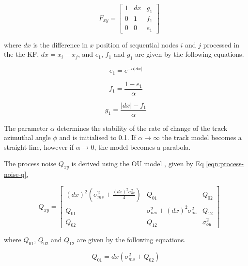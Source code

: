 \begin{equation}
\quad F_{xy} = \begin{bmatrix} 1 & dx & g_1 \\ 0 & 1 & f_1 \\ 0 & 0 & e_1 \end{bmatrix} 
\label{eqn:state-transition-jacobian-ou}
\end{equation}

where $dx$ is the difference in $x$ position of sequential nodes $i$ and $j$ processed in the the KF, $dx = x_i - x_j$, and $e_1$, $f_1$ and $g_1$ are given by the following equations. 

\begin{equation}
e_1 = e^{- \alpha \lvert dx \rvert}
\label{eqn:e1}
\end{equation}

\begin{equation}
f_1 = \frac{1 - e_1}{\alpha}
\label{eqn:f1}
\end{equation}

\begin{equation}
g_1 = \frac{\lvert dx \rvert - f_1}{\alpha}
\label{eqn:g1}
\end{equation}

The parameter $\alpha$ determines the stability of the rate of change of the track azimuthal angle $\phi$ and is initialised to 0.1. If $\alpha \rightarrow \infty$ the track model becomes a straight line, however if $\alpha \rightarrow 0$, the model becomes a parabola.

The process noise $Q_{xy}$ is derived using the OU model \cite{OU}, given by Eq \eqref{eqn:process-noise-q}, 
 

\begin{equation}
\quad Q_{xy} = \begin{bmatrix} (dx)^{2} (\sigma_{ms}^{2} + \frac{(dx)^{2} \sigma_{ou}^{2}}{4}) & Q_{01} & Q_{02} \\  Q_{01} & \sigma_{ms}^2 + (dx)^{2} \sigma_{ou}^{2} & Q_{12} \\ Q_{02} & Q_{12} & \sigma_{ou}^{2} \end{bmatrix} 
\label{eqn:process-noise-q}
\end{equation}

where $Q_{01}$, $Q_{02}$ and $Q_{12}$ are given by the following equations.

\begin{equation}
Q_{01} = dx( \sigma_{ms}^2 + Q_{02} )
\label{eqn:q01}
\end{equation}

